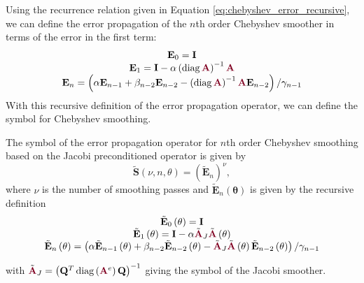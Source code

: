 Using the recurrence relation given in Equation \ref{eq:chebyshev_error_recursive}, we can define the error propagation of the $n$th order Chebyshev smoother in terms of the error in the first term:
\begin{equation}
\begin{tabular}{c}
$\mathbf{E}_0 = \mathbf{I}$\\
$\mathbf{E}_1 = \mathbf{I} - \alpha \left( \diag {\color{burgundy}\mathbf{A}} \right)^{-1} {\color{burgundy}\mathbf{A}}$\\
$\mathbf{E}_n = \left( \alpha \mathbf{E}_{n - 1} + \beta_{n - 2} \mathbf{E}_{n - 2} - \left( \diag {\color{burgundy}\mathbf{A}} \right)^{-1} {\color{burgundy}\mathbf{A}} \mathbf{E}_{n - 2} \right) / \gamma_{n - 1}$
\end{tabular}
\label{eq:chebyshev_error_propagation}
\end{equation}
With this recursive definition of the error propagation operator, we can define the symbol for Chebyshev smoothing.

\begin{definition}
The symbol of the error propagation operator for $n$th order Chebyshev smoothing based on the Jacobi preconditioned operator is given by
\begin{equation}
\tilde{\mathbf{S}} \left( \nu, n, \theta \right) = \left( \tilde{\mathbf{E}}_n \right)^\nu,
\end{equation}
where $\nu$ is the number of smoothing passes and $\tilde{\mathbf{E}}_n \left( \mathbf{\theta} \right)$ is given by the recursive definition
\begin{equation}
\begin{tabular}{c}
$\tilde{\mathbf{E}}_0 \left( \mathbf{\theta} \right) = \mathbf{I}$\\
$\tilde{\mathbf{E}}_1 \left( \mathbf{\theta} \right) = \mathbf{I} - \alpha \tilde{\color{burgundy}\mathbf{A}}_J \tilde{\color{burgundy}\mathbf{A}} \left( \mathbf{\theta} \right)$\\
$\tilde{\mathbf{E}}_n \left( \mathbf{\theta} \right) = \left( \alpha \tilde{\mathbf{E}}_{n - 1} \left( \mathbf{\theta} \right) + \beta_{n - 2} \tilde{\mathbf{E}}_{n - 2} \left( \mathbf{\theta} \right) - \tilde{\color{burgundy}\mathbf{A}}_J \tilde{\color{burgundy}\mathbf{A}} \left( \mathbf{\theta} \right) \tilde{\mathbf{E}}_{n - 2} \left( \mathbf{\theta} \right) \right) / \gamma_{n - 1}$
\end{tabular}
\end{equation}
\label{def:chebyshev_symbol}
\end{definition}
with $\tilde{\color{burgundy}\mathbf{A}}_J = \left( \mathbf{Q}^T \diag \left( {\color{burgundy}\mathbf{A}}^e \right) \mathbf{Q} \right)^{-1}$ giving the symbol of the Jacobi smoother.

